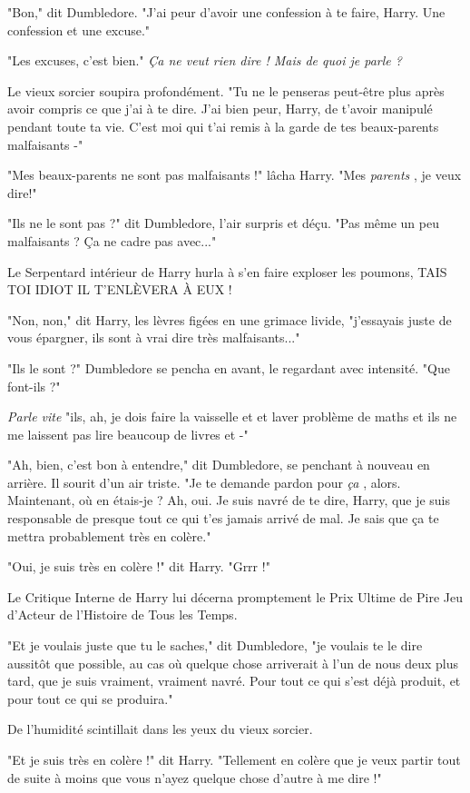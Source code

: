 "Bon," dit Dumbledore. "J'ai peur d'avoir une confession à te faire, Harry. Une confession et une excuse."

"Les excuses, c'est bien." \emph{Ça ne veut rien dire ! Mais de quoi je parle ?} 

Le vieux sorcier soupira profondément. "Tu ne le penseras peut-être plus après avoir compris ce que j'ai à te dire. J'ai bien peur, Harry, de t'avoir manipulé pendant toute ta vie. C'est moi qui t'ai remis à la garde de tes beaux-parents malfaisants -"

"Mes beaux-parents ne sont pas malfaisants !" lâcha Harry. "Mes \emph{parents} , je veux dire!"

"Ils ne le sont pas ?" dit Dumbledore, l'air surpris et déçu. "Pas même un peu malfaisants ? Ça ne cadre pas avec..."

Le Serpentard intérieur de Harry hurla à s'en faire exploser les poumons, TAIS TOI IDIOT IL T'ENLÈVERA À EUX !

"Non, non," dit Harry, les lèvres figées en une grimace livide, "j'essayais juste de vous épargner, ils sont à vrai dire très malfaisants..."

"Ils le sont ?" Dumbledore se pencha en avant, le regardant avec intensité. "Que font-ils ?"

\emph{Parle vite}  "ils, ah, je dois faire la vaisselle et et laver problème de maths et ils ne me laissent pas lire beaucoup de livres et -"

"Ah, bien, c'est bon à entendre," dit Dumbledore, se penchant à nouveau en arrière. Il sourit d'un air triste. "Je te demande pardon pour \emph{ça} , alors. Maintenant, où en étais-je ? Ah, oui. Je suis navré de te dire, Harry, que je suis responsable de presque tout ce qui t'es jamais arrivé de mal. Je sais que ça te mettra probablement très en colère."

"Oui, je suis très en colère !" dit Harry. "Grrr !"

Le Critique Interne de Harry lui décerna promptement le Prix Ultime de Pire Jeu d'Acteur de l'Histoire de Tous les Temps.

"Et je voulais juste que tu le saches," dit Dumbledore, "je voulais te le dire aussitôt que possible, au cas où quelque chose arriverait à l'un de nous deux plus tard, que je suis vraiment, vraiment navré. Pour tout ce qui s'est déjà produit, et pour tout ce qui se produira."

De l'humidité scintillait dans les yeux du vieux sorcier.

"Et je suis très en colère !" dit Harry. "Tellement en colère que je veux partir tout de suite à moins que vous n'ayez quelque chose d'autre à me dire !"

